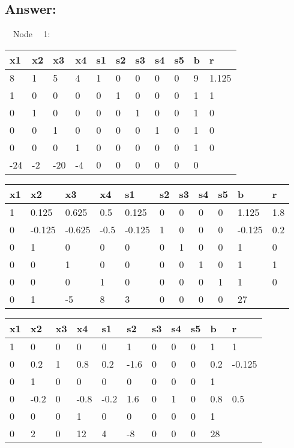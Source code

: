 \documentclass{article} %
\numberwithin{equation}{section} %
\numberwithin{figure}{section} %
\numberwithin{table}{section} %
\begin{document}
\subsection*{Answer:}
\ \
Node \ \ 1:
\begin{center}
\begin{tabular}{|l|l|l|l|l|l|l|l|l|l|l|}
\hline
x1  & x2 & x3  & x4 & s1 & s2 & s3 & s4 & s5 & b & r     \\ \hline
8   & 1  & 5   & 4  & 1  & 0  & 0  & 0  & 0  & 9 & 1.125 \\ \hline
1   & 0  & 0   & 0  & 0  & 1  & 0  & 0  & 0  & 1 & 1     \\ \hline
0   & 1  & 0   & 0  & 0  & 0  & 1  & 0  & 0  & 1 & 0     \\ \hline
0   & 0  & 1   & 0  & 0  & 0  & 0  & 1  & 0  & 1 & 0     \\ \hline
0   & 0  & 0   & 1  & 0  & 0  & 0  & 0  & 0  & 1 & 0     \\ \hline
-24 & -2 & -20 & -4 & 0  & 0  & 0  & 0  & 0  & 0 &       \\ \hline
\end{tabular}
\end{center}
\begin{center}
\begin{tabular}{|l|l|l|l|l|l|l|l|l|l|l|}
\hline
x1 & x2     & x3     & x4   & s1     & s2 & s3 & s4 & s5 & b      & r   \\ \hline
1  & 0.125  & 0.625  & 0.5  & 0.125  & 0  & 0  & 0  & 0  & 1.125  & 1.8 \\ \hline
0  & -0.125 & -0.625 & -0.5 & -0.125 & 1  & 0  & 0  & 0  & -0.125 & 0.2 \\ \hline
0  & 1      & 0      & 0    & 0      & 0  & 1  & 0  & 0  & 1      & 0   \\ \hline
0  & 0      & 1      & 0    & 0      & 0  & 0  & 1  & 0  & 1      & 1   \\ \hline
0  & 0      & 0      & 1    & 0      & 0  & 0  & 0  & 1  & 1      & 0   \\ \hline
0  & 1      & -5     & 8    & 3      & 0  & 0  & 0  & 0  & 27     &     \\ \hline
\end{tabular}
\end{center}
\begin{center}
\begin{tabular}{|l|l|l|l|l|l|l|l|l|l|l|}
\hline
x1 & x2   & x3 & x4   & s1   & s2   & s3 & s4 & s5 & b   & r      \\ \hline
1  & 0    & 0  & 0    & 0    & 1    & 0  & 0  & 0  & 1   & 1      \\ \hline
0  & 0.2  & 1  & 0.8  & 0.2  & -1.6 & 0  & 0  & 0  & 0.2 & -0.125 \\ \hline
0  & 1    & 0  & 0    & 0    & 0    & 0  & 0  & 0  & 1   &        \\ \hline
0  & -0.2 & 0  & -0.8 & -0.2 & 1.6  & 0  & 1  & 0  & 0.8 & 0.5    \\ \hline
0  & 0    & 0  & 1    & 0    & 0    & 0  & 0  & 0  & 1   &        \\ \hline
0  & 2    & 0  & 12   & 4    & -8   & 0  & 0  & 0  & 28  &        \\ \hline
\end{tabular}
\end{center}
\end{document}

